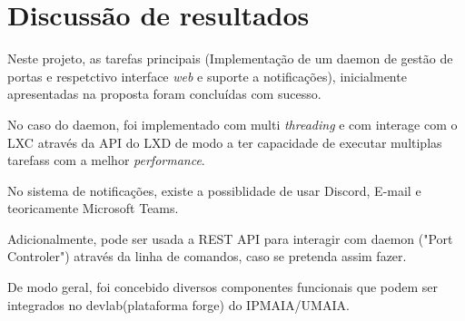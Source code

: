 \chapter{Discussão de resultados}
\label{cap:results}

Neste projeto, as tarefas principais (Implementação de um daemon de gestão de portas
e respetctivo interface \textit{web} e suporte a notificações), inicialmente 
apresentadas na proposta foram concluídas com sucesso.

No caso do daemon, foi implementado com multi \textit{threading} e com interage com
o LXC através da API do LXD de modo a ter capacidade de executar multiplas tarefass com a melhor
\textit{performance}.

No sistema de notificações, existe a possiblidade de usar Discord, E-mail e teoricamente Microsoft Teams.

Adicionalmente, pode ser usada a REST API para interagir com daemon ("Port Controler")
através da linha de comandos, caso se pretenda assim fazer.

De modo geral, foi concebido diversos componentes funcionais que podem ser integrados no
devlab(plataforma forge) do IPMAIA/UMAIA.